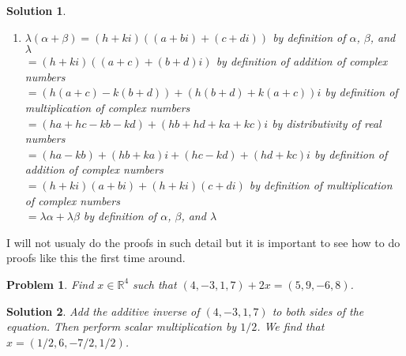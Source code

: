 \documentclass{article}
\theoremstyle{problemstyle}
\newtheorem{problem}{Problem}
\theoremstyle{problemstyle}
\newtheorem{solution}{Solution}
\begin{document}
\begin{solution}
\begin{enumerate}
\item $\lambda(\alpha+\beta) = (h+ki)((a+bi)+(c+di))$ by definition of $\alpha$, $\beta$, and $\lambda$\\
$= (h+ki)((a+c)+(b+d)i)$ by definition of addition of complex numbers\\
$= (h(a+c)-k(b+d))+(h(b+d)+k(a+c))i$ by definition of multiplication of complex numbers\\
$= (ha+hc-kb-kd) + (hb+hd + ka + kc)i$ by distributivity of real numbers\\
$= (ha-kb)+(hb+ka)i+ (hc-kd)+(hd+kc)i$ by definition of addition of complex numbers\\
$= (h+ki)(a+bi) + (h+ki)(c+di)$ by definition of multiplication of complex numbers\\
$= \lambda\alpha +\lambda\beta$ by definition of $\alpha$, $\beta$, and $\lambda$
\end{enumerate}
\end{solution}

I will not usualy do the proofs in such detail but it is important to see how to do proofs like this the first time around. 

\begin{problem}
Find $x \in \mathbb{R}^4$ such that $(4,-3,1,7)+2x = (5,9,-6,8)$.
\end{problem}
\begin{solution}
Add the additive inverse of $(4,-3,1,7)$ to both sides of the equation. Then perform scalar multiplication by $1/2$. We find that $x = (1/2, 6, -7/2, 1/2)$. 
\end{solution}
\end{document}
